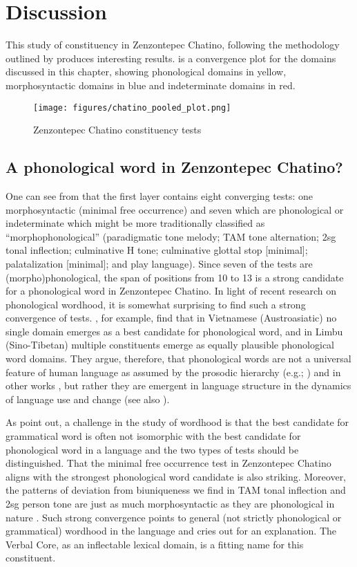 \documentclass[output=paper]{langscibook}
\begin{document}
\section{Discussion}
\label{bkm:Ref90326435}
This study of constituency in Zenzontepec Chatino, following the methodology outlined by \citet{Tallman2021} produces interesting results.
 is a convergence plot for the domains discussed in this chapter, showing phonological domains in yellow, morphosyntactic domains in blue and indeterminate domains in red.

\begin{figure}
    \texttt{[image: figures/chatino\_pooled\_plot.png]}
    \caption{Zenzontepec Chatino constituency tests}
    \label{fig:zenz:poooled_plot}
\end{figure}

\subsection{A phonological word in Zenzontepec Chatino?} 
 
One can see from  that the first layer contains eight converging tests: one morphosyntactic (minimal free occurrence) and seven which are phonological or indeterminate which might be more traditionally classified as ``morphophonological'' (paradigmatic tone melody; TAM tone alternation; 2sg tonal inflection; culminative H tone; culminative glottal stop [minimal]; palatalization [minimal]; and play language). Since seven of the tests are (morpho)phonological, the span of positions from 10 to 13 is a strong candidate for a phonological word in Zenzontepec Chatino. In light of recent research on phonological wordhood, it is somewhat surprising to find such a strong convergence of tests. \citet{Schiering2010}, for example, find that in Vietnamese (Austroasiatic) no single domain emerges as a best candidate for phonological word, and in Limbu (Sino-Tibetan) multiple constituents emerge as equally plausible phonological word domains. They argue, therefore, that phonological words are not a universal feature of human language as assumed by the prosodic hierarchy (e.g.; \citealt{Nespor1986}) and in other works \citep{Hall1999}, but rather they are emergent in language structure in the dynamics of language use and change (see also ).

As \citet[6]{dixonaikhenvald02} point out, a challenge in the study of wordhood is that the best candidate for grammatical word is often not isomorphic with the best candidate for phonological word in a language and the two types of tests should be distinguished. That the minimal free occurrence test in Zenzontepec Chatino aligns with the strongest phonological word candidate is also striking. Moreover, the patterns of deviation from biuniqueness we find in TAM tonal inflection and 2sg person tone are just as much morphosyntactic as they are phonological in nature \citep{Woodbury2019}. Such strong convergence points to general (not strictly phonological or grammatical) wordhood in the language and cries out for an explanation. The Verbal Core, as an inflectable lexical domain, is a fitting name for this constituent.
\end{document}
